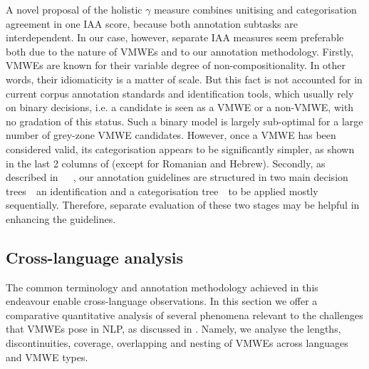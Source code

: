 \documentclass[output=paper,
modfonts,
]{langscibook}
\begin{document}
A novel proposal of the holistic $\gamma$ measure \citep{DBLP:journals/coling/MathetWM15}  combines unitising and categorisation agreement in one IAA score, because both annotation subtasks are interdependent. In our case, however, separate IAA measures seem preferable both due to the nature of VMWEs and to our annotation methodology. Firstly, VMWEs are known for their variable degree of non-compositionality. In other words, their idiomaticity is a matter of scale. But this fact is not accounted for in current corpus annotation standards and identification tools, which usually rely on binary decisions, i.e. a candidate is seen as a VMWE or a non-VMWE, with no gradation of this status. Such a binary model is largely sub-optimal for a large number of grey-zone VMWE candidates. 
However, once a VMWE has been considered valid,  its categorisation appears to be significantly simpler, as shown in the last 2 columns of  (except for Romanian and Hebrew). Secondly, as described in~~\textendash~, our annotation guidelines are structured in two main decision trees~\textendash~an identification and a categorisation tree~\textendash~to be applied mostly sequentially. %
Therefore, separate evaluation of these two stages may be helpful in enhancing the guidelines.


\subsection{Cross-language analysis}
\label{sec:analysis}
%

The common terminology and annotation methodology achieved in this endeavour enable cross-language observations. In this section we offer a comparative quantitative analysis of several phenomena relevant to the challenges that VMWEs pose in NLP, as discussed in . Namely, we analyse the lengths, discontinuities, coverage, overlapping and nesting of VMWEs across languages and VMWE types.
\end{document}
